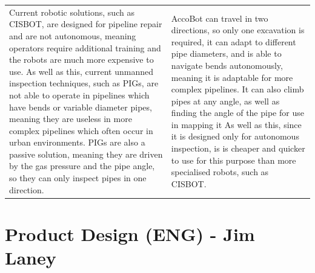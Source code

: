 \documentclass[11pt]{article}		%
\begin{document}
\begin{longtable}[c]{| m{} | m{} |}
			\hline
			\rowcolor{rowGrey} Current robotic solutions, such as CISBOT, are designed for pipeline repair and are not autonomous, meaning operators require additional training and the robots are much more expensive to use.
			As well as this, current unmanned inspection techniques, such as PIGs, are not able to operate in pipelines which have bends or variable diameter pipes, meaning they are useless in more complex pipelines which often occur in urban environments.
			PIGs are also a passive solution, meaning they are driven by the gas pressure and the pipe angle, so they can only inspect pipes in one direction.
			& 
			AccoBot can travel in two directions, so only one excavation is required, it can adapt to different pipe diameters, and is able to navigate bends autonomously, meaning it is adaptable for more complex pipelines.
			It can also climb pipes at any angle, as well as finding the angle of the pipe for use in mapping it
			As well as this, since it is designed only for autonomous inspection, is is cheaper and quicker to use for this purpose than more specialised robots, such as CISBOT.
			\label{solutionTable}
		\end{longtable}
		
		
	\section[Product Design - ENG]{Product Design (ENG) - Jim Laney}
        
\end{document}
